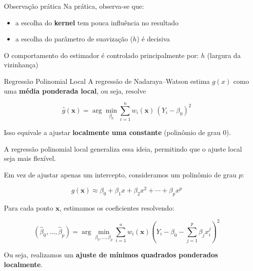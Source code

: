 \documentclass[
  ignorenonframetext,
  aspectratio=169,
]{beamer}
\providecommand{\tightlist}{%
  \setlength{\itemsep}{0pt}\setlength{\parskip}{0pt}}
\begin{document}
\begin{frame}
\begin{block}{Observação prática}
\label{observauxe7uxe3o-pruxe1tica}
Na prática, observa-se que:

\begin{itemize}
\tightlist
\item
  a escolha do \textbf{kernel} tem pouca influência no resultado\\
\item
  a escolha do parâmetro de suavização (\(h\)) é decisiva
\end{itemize}

O comportamento do estimador é controlado principalmente por: \(h\)
(largura da vizinhança)
\end{block}
\end{frame}

\begin{frame}{Regressão Polinomial Local}
\label{regressuxe3o-polinomial-local}
A regressão de Nadaraya--Watson estima \(g(x)\) como uma \textbf{média
ponderada local}, ou seja, resolve

\[
\hat{g}(\mathbf{x}) = \arg\min_{\beta_0} \sum_{i=1}^n w_i(\mathbf{x})\,(Y_i - \beta_0)^2
\]

Isso equivale a ajustar \textbf{localmente uma constante} (polinômio de
grau 0).
\end{frame}

\begin{frame}
A regressão polinomial local generaliza essa ideia, permitindo que o
ajuste local seja mais flexível.

Em vez de ajustar apenas um intercepto, consideramos um polinômio de
grau \(p\):

\[
g(\mathbf{x}) \approx \beta_0 + \beta_1 x + \beta_2 x^2 + \cdots + \beta_p x^p
\]
\end{frame}

\begin{frame}
Para cada ponto \(\mathbf{x}\), estimamos os coeficientes resolvendo:

\[
(\hat{\beta}_0, \ldots, \hat{\beta}_p)
=
\arg\min_{\beta_0,\ldots,\beta_p}
\sum_{i=1}^n w_i(\mathbf{x})\left(Y_i - \beta_0 - \sum_{j=1}^p \beta_j x_i^j \right)^2
\]

Ou seja, realizamos um \textbf{ajuste de mínimos quadrados ponderados
localmente}.
\end{frame}
\end{document}
